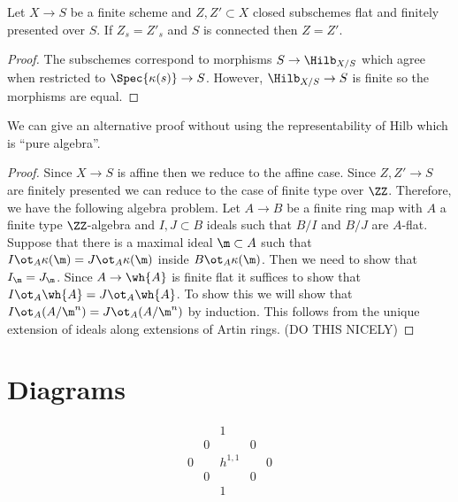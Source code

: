 \documentclass[12pt]{article}
\begin{document}
\begin{prop}
Let $X \to S$ be a finite \etale scheme and $Z, Z' \subset X$ closed subschemes flat and finitely presented over $S$. If $Z_s = Z'_s$ and $S$ is connected then $Z = Z'$.
\end{prop}

\begin{proof}
The subschemes correspond to morphisms $S \to \Hilb_{X/S}$ which agree when restricted to $\Spec{\kappa(s)} \to S$. However, $\Hilb_{X/S} \to S$ is finite \etale so the morphisms are equal.
\end{proof}

\begin{rmk}
We can give an alternative proof without using the representability of Hilb which is ``pure algebra''. 
\end{rmk}

\begin{proof}
Since $X \to S$ is affine then we reduce to the affine case. Since $Z, Z' \to S$ are finitely presented we can reduce to the case of finite type over $\ZZ$. Therefore, we have the following algebra problem. Let $A \to B$ be a finite \etale ring map with $A$ a finite type $\ZZ$-algebra and $I, J \subset B$ ideals such that $B/I$ and $B/J$ are $A$-flat. Suppose that there is a maximal ideal $\m \subset A$ such that $I \ot_A \kappa(\m) = J \ot_A \kappa(\m)$ inside $B \ot_A \kappa(\m)$. Then we need to show that $I_\m = J_\m$. Since $A \to \wh{A}$ is finite flat it suffices to show that $I \ot_A \wh{A} = J \ot_A \wh{A}$. To show this we will show that $I \ot_A (A/\m^n) = J \ot_A (A / \m^n)$ by induction. This follows from the unique extension of ideals along extensions of Artin rings. (DO THIS NICELY) 
\end{proof}

\section{Diagrams}


\[
\begin{array}{ccccccc}
    &   &   & 1 &   &   & \\
    &   & 0 &   & 0 &   & \\
    & 0 &   & h^{1,1} &   & 0 & \\
    &   & 0 &   & 0 &   & \\
    &   &   & 1 &   &   &
\end{array}
\]
\end{document}
